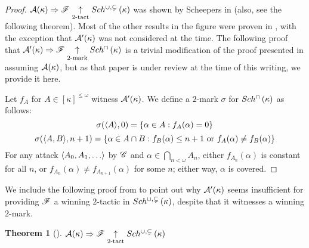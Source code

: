 \documentclass{amsart}
\theoremstyle{plain}
\newtheorem{theorem}{Theorem}
\theoremstyle{definition}
\theoremstyle{remark}
\theoremstyle{plain}
\theoremstyle{definition}
\theoremstyle{remark}
\begin{document}
  \begin{proof}
    \(\mathcal{A}(\kappa)\Rightarrow\mathscr{F} \underset{2\text{-tact}}{\uparrow}Sch^{\cup,\subsetneq}\left({\kappa}\right)\) was
    shown by Scheepers in \cite{MR1129143} (also, see the following theorem).
    Most of the other results in the figure were proven
    in \cite{clontzMengerGamePreprint}, with the exception that
    \(\mathcal{A}'(\kappa)\) was not considered at the time.
    The following proof that
    \(\mathcal{A}'(\kappa)\Rightarrow\mathscr{F} \underset{2\text{-mark}}{\uparrow}Sch^{\cap}\left({\kappa}\right)\)
    is a trivial modification of the proof presented in
    \cite{clontzMengerGamePreprint} assuming \(\mathcal{A}(\kappa)\), but as
    that paper is under review at the time
    of this writing, we provide it here.

    Let \(f_A\) for \(A\in[\kappa]^{\leq\omega}\) witness \(\mathcal{A}'(\kappa)\).
    We define a \(2\)-mark \(\sigma\) for \(Sch^{\cap}\left({\kappa}\right)\) as follows:
      \[
        \sigma(\langle A\rangle,0) = \{\alpha\in A: f_A(\alpha) = 0 \}
      \]
      \[
        \sigma(\langle A,B\rangle,n+1)
          =
        \{
          \alpha \in A\cap B
        :
          f_B(\alpha) \leq n+1 \text{ or }
          f_A(\alpha)\not=f_B(\alpha)
        \}
      \]
    For any attack \(\<A_0,A_1,\dots\>\) by \(\mathscr{C}\) and
    \(\alpha\in\bigcap_{n<\omega}A_n\), either \(f_{A_n}(\alpha)\) is constant for
    all \(n\), or \(f_{A_n}(\alpha)\not=f_{A_{n+1}}(\alpha)\) for some \(n\);
    either way, \(\alpha\) is covered.
  \end{proof}

  We include the following proof from \cite{MR1129143} to point
  out why \(\mathcal{A}'(\kappa)\) seems insufficient for providing \(\mathscr{F}\) a
  winning \(2\)-tactic in \(Sch^{\cup,\subsetneq}\left({\kappa}\right)\), despite that it
  witnesses a winning \(2\)-mark.

  \begin{theorem}[\cite{MR1129143}]
    \(\mathcal{A}(\kappa)\Rightarrow\mathscr{F} \underset{2\text{-tact}}{\uparrow}Sch^{\cup,\subsetneq}\left({\kappa}\right)\)
  \end{theorem}
\end{document}
